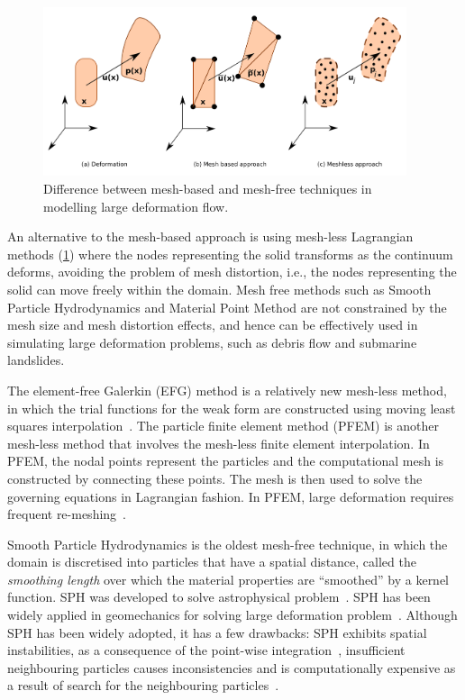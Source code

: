 \begin{figure}[tbhp]
\centering
\includegraphics[width=0.95\textwidth]{NumericalMethods}
\caption{Difference between mesh-based and mesh-free techniques in modelling 
large deformation flow.}
\label{fig:NumericalMethods}
\end{figure}

An alternative to the mesh-based approach is using mesh-less Lagrangian methods 
(\cref{fig:NumericalMethods}) where the nodes representing the solid transforms 
as the continuum deforms, avoiding the problem of mesh distortion, i.e., the 
nodes representing the solid can move freely within the domain. Mesh free 
methods such as Smooth Particle Hydrodynamics and Material Point Method are not 
constrained by the mesh size and mesh distortion effects, and hence can be 
effectively used in simulating large deformation problems, such as debris flow 
and submarine landslides.

The element-free Galerkin (EFG) method is a relatively new mesh-less 
method, in which the trial functions for the weak form are constructed using 
moving least squares interpolation~\citep{Belytschko1994}. The particle finite 
element method (PFEM) is another mesh-less method that involves the mesh-less 
finite element interpolation. In PFEM, the nodal points represent the 
particles and the computational mesh is constructed by connecting these points. 
The mesh is then used to solve the governing equations in Lagrangian fashion. 
In PFEM, large deformation requires frequent re-meshing~\citep{Kafaji2013}.

Smooth Particle Hydrodynamics is the oldest mesh-free technique, in which the 
domain is discretised into particles that have a spatial distance, called the 
\textit{smoothing length} over which the material properties are ``smoothed'' 
by a kernel function. SPH was developed to solve astrophysical 
problem~\citep{Monaghan2005}. SPH has been widely applied 
in geomechanics for solving large deformation 
problem~\citep{Augarde2009,Maeda2010,Mori2008}. Although SPH has been widely 
adopted, it has a few drawbacks: SPH exhibits 
spatial instabilities, as a consequence of the point-wise 
integration~\citep{Bonet2000}, insufficient neighbouring particles causes 
inconsistencies and is computationally expensive as a result of search for the 
neighbouring particles~\citep{Bandara2013}.

